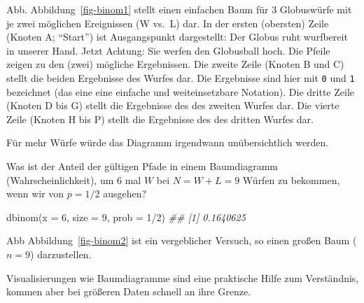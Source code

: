 \documentclass[
  a4paper,
  DIV=11]{scrreprt}
\newenvironment{Shaded}{\begin{snugshade}}{\end{snugshade}}
\newcommand{\AttributeTok}[1]{\textcolor[rgb]{0.40,0.45,0.13}{#1}}
\newcommand{\DecValTok}[1]{\textcolor[rgb]{0.68,0.00,0.00}{#1}}
\newcommand{\DocumentationTok}[1]{\textcolor[rgb]{0.37,0.37,0.37}{\textit{#1}}}
\newcommand{\FunctionTok}[1]{\textcolor[rgb]{0.28,0.35,0.67}{#1}}
\newcommand{\NormalTok}[1]{\textcolor[rgb]{0.00,0.23,0.31}{#1}}
\newcommand{\SpecialCharTok}[1]{\textcolor[rgb]{0.37,0.37,0.37}{#1}}
\theoremstyle{definition}
\theoremstyle{remark}
\begin{document}
Abb. Abbildung~\ref{fig-binom1} stellt einen einfachen Baum für 3
Globuswürfe mit je zwei möglichen Ereignissen (W vs.~L) dar. In der
ersten (obersten) Zeile (Knoten A; ``Start'') ist Ausgangspunkt
dargestellt: Der Globus ruht wurfbereit in unserer Hand. Jetzt Achtung:
Sie werfen den Globusball hoch. Die Pfeile zeigen zu den (zwei) mögliche
Ergebnissen. Die zweite Zeile (Knoten B und C) stellt die beiden
Ergebnisse des Wurfes dar. Die Ergebnisse sind hier mit \texttt{0} und
\texttt{1} bezeichnet (das eine eine einfache und weiteinsetzbare
Notation). Die dritte Zeile (Knoten D bis G) stellt die Ergebnisse des
des zweiten Wurfes dar. Die vierte Zeile (Knoten H bis P) stellt die
Ergebnisse des des dritten Wurfes dar.

Für mehr Würfe würde das Diagramm irgendwann unübersichtlich werden.

Was ist der Anteil der gültigen Pfade in einem Baumdiagramm
(Wahrscheinlichkeit), um 6 mal \(W\) bei \(N=W+L=9\) Würfen zu bekommen,
wenn wir von \(p=1/2\) ausgehen?

\begin{Shaded}
\begin{Highlighting}[]
\FunctionTok{dbinom}\NormalTok{(}\AttributeTok{x =} \DecValTok{6}\NormalTok{, }\AttributeTok{size =} \DecValTok{9}\NormalTok{, }\AttributeTok{prob =} \DecValTok{1}\SpecialCharTok{/}\DecValTok{2}\NormalTok{)}
\DocumentationTok{\#\# [1] 0.1640625}
\end{Highlighting}
\end{Shaded}

Abb Abbildung~\ref{fig-binom2} ist ein vergeblicher Versuch, so einen
großen Baum (\(n=9\)) darzustellen.

\begin{tcolorbox}[enhanced jigsaw, colframe=quarto-callout-note-color-frame, title=\textcolor{quarto-callout-note-color}{\faInfo}\hspace{0.5em}{Hinweis}, breakable, leftrule=.75mm, coltitle=black, toptitle=1mm, bottomrule=.15mm, bottomtitle=1mm, opacityback=0, arc=.35mm, rightrule=.15mm, left=2mm, colbacktitle=quarto-callout-note-color!10!white, opacitybacktitle=0.6, toprule=.15mm, titlerule=0mm, colback=white]
Visualisierungen wie Baumdiagramme sind eine praktische Hilfe zum
Verständnis, kommen aber bei größeren Daten schnell an ihre Grenze.
\end{tcolorbox}
\end{document}
